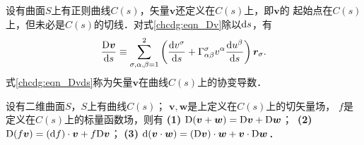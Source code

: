 设有曲面$S$上有正则曲线$C(s)$，矢量$\boldsymbol{v}$还定义在$C(s)$上，即$\boldsymbol{v}$的
起始点在$C(s)$上，但未必是$C(s)$的切线．对式\eqref{chcdg:eqn_Dv}除以${\rm d}s$，有
\begin{equation}\label{chcdg:eqn_Dvds}
    \frac{{\rm D} \boldsymbol{v}}{{\rm d}s} \equiv \sum_{\sigma,\alpha,\beta=1}^{2} 
    \left( \frac{\mathrm{d} v^\sigma } {{\rm d}s}
    +  \Gamma_{\alpha \beta}^\sigma v^\alpha 
    \frac{\mathrm{d} u^\beta}{{\rm d}s}  \right) \boldsymbol{r}_\sigma .
\end{equation}
式\eqref{chcdg:eqn_Dvds}称为矢量$\boldsymbol{v}$在曲线$C(s)$上的{\heiti 协变导数}．

\begin{theorem}\label{chcdg:thm_connection}
    设有二维曲面$S$，$S$上有曲线$C(s)$；
    $\boldsymbol{v}, \boldsymbol{w}$是上定义在$C(s)$上的切矢量场，
    $f$是定义在$C(s)$上的标量函数场，则有    
    {\bfseries (1)} ${\rm D}(\boldsymbol{v}+\boldsymbol{w})={\rm D} \boldsymbol{v}+{\rm D} \boldsymbol{w}$；$\ $    
    {\bfseries (2)} ${\rm D}(f \boldsymbol{v})=(\mathrm{d} f) \cdot \boldsymbol{v}+f {\rm D} \boldsymbol{v}$；%
    {\bfseries (3)} $\mathrm{d}(\boldsymbol{v} \cdot \boldsymbol{w})=({\rm D} \boldsymbol{v}) 
    \cdot \boldsymbol{w} +\boldsymbol{v} \cdot {\rm D} \boldsymbol{w}$．
\end{theorem}
